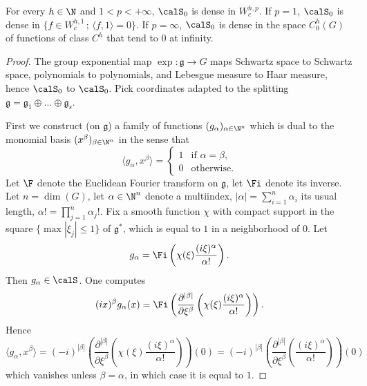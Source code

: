 \begin{prop}\label{prop:density-s_0}
For every $h\in\N$ and $1<p<+\infty$, $\calS_0$ is dense in $W^{h,p}_c$. If $p=1$, $\calS_0$ is dense in $\{f\in W_c^{h,1}\,;\,\langle f,1 \rangle=0\}$. If $p=\infty$, $\calS_0$ is dense in the space $C^h_0(G)$ of functions of class $C^h$ that tend to $0$ at infinity.
\end{prop}

\begin{proof}
The group exponential map $\exp:\mathfrak{g}\to G$ maps Schwartz space to Schwartz space, polynomials to polynomials, and Lebesgue measure to Haar measure, hence $\calS_0$ to $\calS_0$. Pick coordinates adapted to the splitting $\mathfrak{g}=\mathfrak{g}_1\oplus\dots\oplus\mathfrak{g}_s$.

First we construct (on $\mathfrak{g}$) a family of functions $(g_\alpha)_{\alpha\in\N^n}$ which is dual to the monomial basis $(x^\beta)_{\beta\in\N^n}$ in the sense that
\[
\langle g_\alpha,x^\beta\rangle=
\begin{cases}
1 & \text{if }\alpha=\beta, \\
0 & \text{otherwise}.
\end{cases}
\]
Let $\F$ denote the Euclidean Fourier transform on $\mathfrak{g}$, let $\Fi$ denote its inverse. Let $n=\dim(G)$, let $\alpha\in\N^n$ denote a multiindex, $|\alpha|=\sum_{i=1}^n \alpha_i$ its usual length, $\alpha!=\prod_{j=1}^n \alpha_j!$. Fix a smooth function $\chi$ with compact support in the square $\{\max |\xi_j| \leq 1\}$ of $\mathfrak{g}^*$, which is equal to $1$ in a neighborhood of $0$. Let
\[
g_\alpha=\Fi\left(\chi(\xi)\frac{(i\xi)^{\alpha}}{\alpha!}\right).
\]
Then $g_\alpha\in\calS$. One computes
\[
(ix)^\beta g_\alpha(x)= \Fi\left(\frac{\partial^{|\beta|}}{\partial\xi^{\beta}} \left(\chi(\xi) \frac{(i\xi)^\alpha}{\alpha!}\right)\right).
\]
Hence
\[
\langle g_\alpha,x^\beta\rangle=(-i)^{|\beta|}\left(\frac{\partial^{|\beta|}}{\partial\xi^{\beta}} \left(\chi(\xi)\frac{(i\xi)^\alpha}{\alpha!}\right) \right)(0) = (-i)^{|\beta|}\left(\frac{\partial^{|\beta|}}{\partial\xi^{\beta}} \left(\frac{(i\xi)^\alpha}{\alpha!}\right)\right)(0)
\]
which vanishes unless $\beta=\alpha$, in which case it is equal to $1$.


\end{proof}
